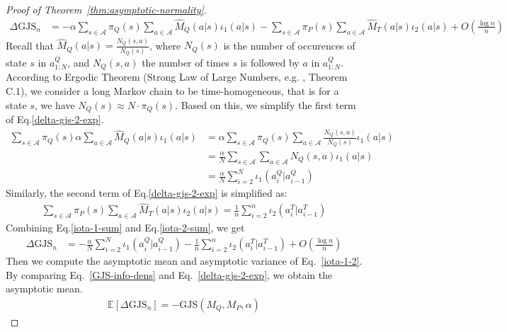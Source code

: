 \documentclass{article}
\theoremstyle{plain}
\theoremstyle{definition}
\theoremstyle{remark}
\begin{document}
\begin{proof}[Proof of Theorem~\ref{thm:asymptotic-normality}]
\begin{align}
    \Delta \text{GJS}_n &= - \alpha\sum_{s\in \mathcal{A}}\pi_Q(s)\sum_{a \in \mathcal{A}} \hat{M}_Q(a|s) \iota_1(a|s) -\sum_{s\in \mathcal{A}}\pi_P(s) \sum_{a \in \mathcal{A}} \hat{M}_T(a|s) \iota_2(a|s) + O\left(\frac{\log n}{n}\right) \label{delta-gjs-2-exp}
\end{align}
Recall that $\hat{M}_Q(a|s)=\frac{N_Q(s,a)}{N_Q(s)}$, where $N_Q(s)$ is the number of occurences of state $s$ in $a^Q_{1:N}$, and $N_Q(s,a)$ the number of times $s$ is followed by $a$ in $a^Q_{1:N}$. According to Ergodic Theorem (Strong Law of Large Numbers, e.g. \cite{levin2017markov}, Theorem C.1), we consider a long Markov chain to be time-homogeneous, that is for a state $s$, we have $N_Q(s) \approx N\cdot \pi_Q(s)$. Based on this, we simplify the first term of Eq.\ref{delta-gjs-2-exp}.
\begin{align}
    \sum_{s \in \mathcal{A}} \pi_Q(s) \alpha \sum_{a \in \mathcal{A}} \hat{M}_Q(a|s)\iota_1(a|s) &= \alpha \sum_{s \in \mathcal{A}} \pi_Q(s) \sum_{a \in \mathcal{A}} \frac{N_Q(s,a)}{N_Q(s)}\iota_1(a|s) \\
    & = \frac{\alpha}{N} \sum_{s \in \mathcal{A}}\sum_{a \in \mathcal{A}}N_Q(s,a)\iota_1(a|s) \\
    & = \frac{\alpha}{N} \sum_{i=2}^{N} \iota_1(a_i^Q|a_{i-1}^Q) \label{iota-1-sum}
\end{align}
Similarly, the second term of Eq.\ref{delta-gjs-2-exp} is simplified as:
\begin{align}
    \sum_{s\in \mathcal{A}}\pi_P(s) \sum_{a \in \mathcal{A}} \hat{M}_T(a|s) \iota_2(a|s) = \frac{1}{n} \sum_{i=2}^{n} \iota_2(a^T_{i}|a_{i-1}^T) \label{iota-2-sum}
\end{align}
Combining Eq.\ref{iota-1-sum} and Eq.\ref{iota-2-sum}, we get
\begin{align}
    \Delta \text{GJS}_n &= -\frac{\alpha}{N} \sum_{i=2}^{N} \iota_1(a_i^Q|a_{i-1}^Q)-\frac{1}{n} \sum_{i=2}^{n} \iota_2(a^T_{i}|a_{i-1}^T)+ O\left(\frac{\log n}{n}\right) \label{iota-1-2}
\end{align}
Then we compute the asymptotic mean and asymptotic variance of Eq.~\ref{iota-1-2}.
By comparing Eq.~\ref{GJS-info-dens} and Eq.~\ref{delta-gjs-2-exp}, we obtain the asymptotic mean.
\begin{align}
    \mathbb{E}[\Delta \text{GJS}_n] = -\text{GJS} (M_Q,M_P,\alpha)
\end{align}


\end{proof}
\end{document}

